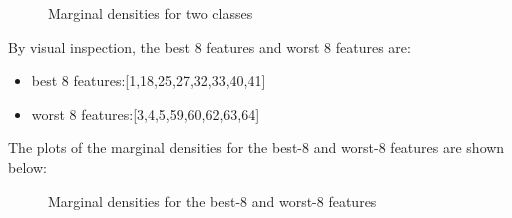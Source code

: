 \documentclass[12pt,letterpaper]{article}
\begin{document}
\begin{enumerate}[a)]
\begin{figure}[H]
            \caption{Marginal densities for two classes}
            \label{Fig.main}
        \end{figure}
        By visual inspection, the best 8 features and worst 8 features are:
        \begin{itemize}
            \item[] best 8 features:[1,18,25,27,32,33,40,41]
            \item[] worst 8 features:[3,4,5,59,60,62,63,64]
        \end{itemize}
        The plots of the marginal densities for the best-8 and worst-8 features are shown below:
        \begin{figure}[H]
            \centering 
        \end{figure}
        \begin{figure}[H]
            \centering 
            \caption{Marginal densities for the best-8 and worst-8 features}
            \label{Fig.bestandworst}
        \end{figure}


\end{enumerate}
\end{document}
